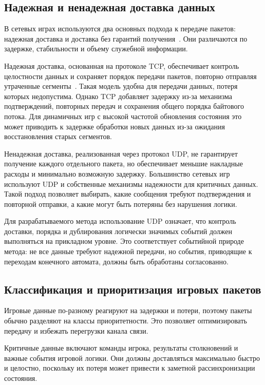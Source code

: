 \subsection{Надежная и ненадежная доставка данных}

В сетевых играх используются два основных подхода к передаче пакетов: надежная доставка и доставка без гарантий получения~\cite{kurose2013networking}. Они различаются по задержке, стабильности и объему служебной информации.

Надежная доставка, основанная на протоколе TCP, обеспечивает контроль целостности данных и сохраняет порядок передачи пакетов, повторно отправляя утраченные сегменты~\cite{stevens2011tcpip}. Такая модель удобна для передачи данных, потеря которых недопустима. Однако TCP добавляет задержку из-за механизма подтверждений, повторных передач и сохранения общего порядка байтового потока. Для динамичных игр с высокой частотой обновления состояния это может приводить к задержке обработки новых данных из-за ожидания восстановления старых сегментов.

Ненадежная доставка, реализованная через протокол UDP, не гарантирует получение каждого отдельного пакета, но обеспечивает меньшие накладные расходы и минимально возможную задержку. Большинство сетевых игр используют UDP и собственные механизмы надежности для критичных данных. Такой подход позволяет выбирать, какие сообщения требуют подтверждения и повторной отправки, а какие могут быть потеряны без нарушения логики.

Для разрабатываемого метода использование UDP означает, что контроль доставки, порядка и дублирования логически значимых событий должен выполняться на прикладном уровне. Это соответствует событийной природе метода: не все данные требуют надежной передачи, но события, приводящие к переходам конечного автомата, должны быть обработаны согласованно.

\subsection{Классификация и приоритизация игровых пакетов}

Игровые данные по-разному реагируют на задержки и потери, поэтому пакеты обычно разделяют на классы приоритетности. Это позволяет оптимизировать передачу и избежать перегрузки канала связи.

Критичные данные включают команды игрока, результаты столкновений и важные события игровой логики. Они должны доставляться максимально быстро и целостно, поскольку их потеря может привести к заметной рассинхронизации состояния.

